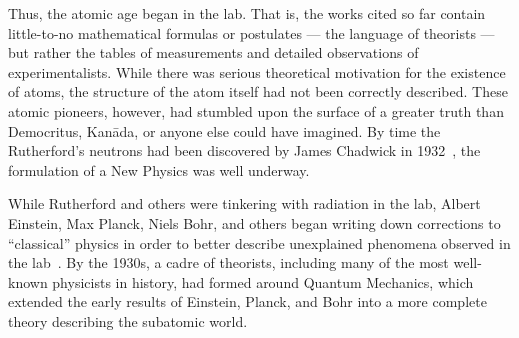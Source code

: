 \begin{dissertationintroduction}
{}
Thus, the atomic age began in the lab. 
That is, the works cited so far contain little-to-no mathematical formulas or postulates --- the language of theorists --- but rather the tables of measurements and detailed observations of experimentalists. 
While there was serious theoretical motivation for the existence of atoms\footnotemark{}, the structure of the atom itself had not been correctly described. 
These atomic pioneers, however, had stumbled upon the surface of a greater truth than Democritus, Kan\=ada, or anyone else could have imagined. 
By time the Rutherford's neutrons had been discovered by James Chadwick in 1932~\cite{Chadwick1932}, the formulation of a New Physics was well underway. 

While Rutherford and others were tinkering with radiation in the lab, Albert Einstein, Max Planck, Niels Bohr, and others began writing down corrections to ``classical'' physics in order to better describe unexplained phenomena observed in the lab~\cite{EinsteinPhotoelectric, Planck, Bohr}. 
By the 1930s, a cadre of theorists, including many of the most well-known physicists in history\footnotemark{}, had formed around Quantum Mechanics, which extended the early results of Einstein, Planck, and Bohr into a more complete theory describing the subatomic world. 
\end{dissertationintroduction}
